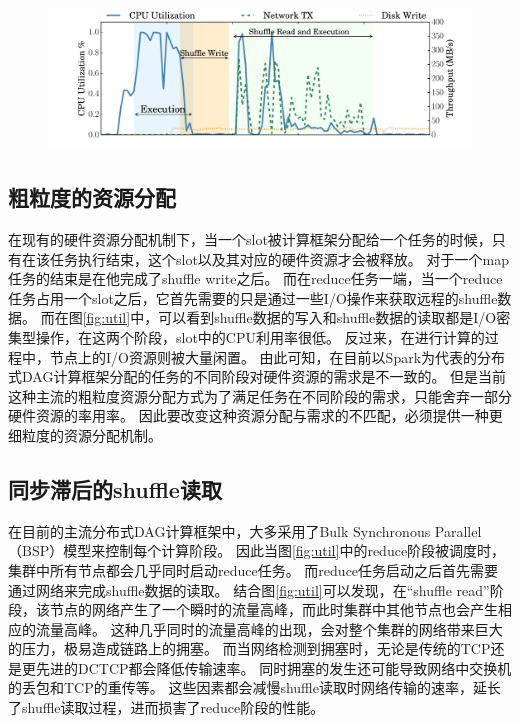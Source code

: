 \begin{figure}[!htp]
	\centering
	\includegraphics[width=\textwidth]{../../PPoPP-2018/fig/util.pdf}
\end{figure}

\subsection{粗粒度的资源分配}

在现有的硬件资源分配机制下，当一个slot被计算框架分配给一个任务的时候，只有在该任务执行结束，这个slot以及其对应的硬件资源才会被释放。
对于一个map任务的结束是在他完成了shuffle write之后。
而在reduce任务一端，当一个reduce任务占用一个slot之后，它首先需要的只是通过一些I/O操作来获取远程的shuffle数据。
而在图\ref{fig:util}中，可以看到shuffle数据的写入和shuffle数据的读取都是I/O密集型操作，在这两个阶段，slot中的CPU利用率很低。
反过来，在进行计算的过程中，节点上的I/O资源则被大量闲置。
由此可知，在目前以Spark为代表的分布式DAG计算框架分配的任务的不同阶段对硬件资源的需求是不一致的。
但是当前这种主流的粗粒度资源分配方式为了满足任务在不同阶段的需求，只能舍弃一部分硬件资源的率用率。
因此要改变这种资源分配与需求的不匹配，必须提供一种更细粒度的资源分配机制。

\subsection{同步滞后的shuffle读取}

在目前的主流分布式DAG计算框架中，大多采用了Bulk Synchronous Parallel（BSP）模型来控制每个计算阶段。
因此当图\ref{fig:util}中的reduce阶段被调度时，集群中所有节点都会几乎同时启动reduce任务。
而reduce任务启动之后首先需要通过网络来完成shuffle数据的读取。
结合图\ref{fig:util}可以发现，在“shuffle read”阶段，该节点的网络产生了一个瞬时的流量高峰，而此时集群中其他节点也会产生相应的流量高峰。
这种几乎同时的流量高峰的出现，会对整个集群的网络带来巨大的压力，极易造成链路上的拥塞。
而当网络检测到拥塞时，无论是传统的TCP\cite{tcp}还是更先进的DCTCP\cite{dctcp}都会降低传输速率。
同时拥塞的发生还可能导致网络中交换机的丢包和TCP的重传等。
这些因素都会减慢shuffle读取时网络传输的速率，延长了shuffle读取过程，进而损害了reduce阶段的性能。

